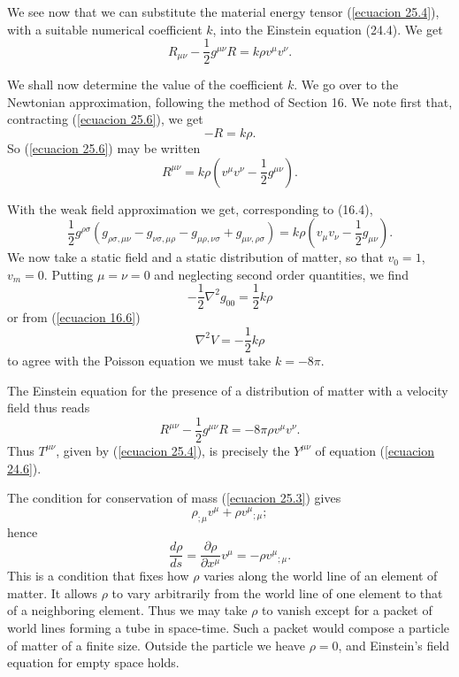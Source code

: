 We see now that we can substitute the material energy tensor (\ref{ecuacion 25.4}), with a suitable numerical 
coefficient $k$, into the Einstein equation (24.4). We get
\begin{equation}
 \label{ecuacion 25.6}
 R_{\mu\nu} - \frac{1}{2} g^{\mu\nu} R = k \rho v^\mu v^\nu.
\end{equation}

We shall now determine the value of the coefficient $k$. We go over to the Newtonian approximation, following the 
method of Section 16. We note first that, contracting (\ref{ecuacion 25.6}), we get
\[
 - R = k \rho .
\]
So (\ref{ecuacion 25.6}) may be written 
\[
 R^{\mu\nu} = k \rho \left( v^\mu v^\nu - \frac{1}{2} g^{\mu\nu} \right).
\]
 
With the weak field approximation we get, corresponding to (16.4),
\[
 \frac{1}{2} g^{\rho\sigma} \left(
     g_{\rho\sigma,\mu\nu} - g_{\nu\sigma,\mu\rho} - g_{\mu\rho,\nu\sigma} + g_{\mu\nu,\rho\sigma}
 \right)
 = k \rho \left(
     v_\mu v_\nu - \frac{1}{2}g_{\mu\nu}
 \right).
\]
We now take a static field and a static distribution of matter, so that $v_0 = 1$, $v_m = 0$. Putting $\mu = \nu = 0$ 
and neglecting second order quantities, we find 
\[
 -\frac{1}{2} \nabla^2 g_{00} = \frac{1}{2} k \rho
\]
or from (\ref{ecuacion 16.6})
\[
 \nabla^2 V = -\frac{1}{2} k \rho
\]
to agree with the Poisson equation we must take $k = - 8 \pi$.

The Einstein equation for the presence of a distribution of matter with a velocity field thus reads
\begin{equation}
 \label{ecuacion 25.7}
 R^{\mu\nu} - \frac{1}{2} g^{\mu\nu} R = - 8\pi \rho v^\mu v^\nu.
\end{equation}
Thus $T^{\mu\nu}$, given by (\ref{ecuacion 25.4}), is precisely the $Y^{\mu\nu}$ of equation (\ref{ecuacion 24.6}).

The condition for conservation of mass (\ref{ecuacion 25.3}) gives
\[
 \rho_{;\mu} v^{\mu} + \rho {v^\mu}_{;\mu};
\]
hence
\begin{equation}
 \label{ecuacion 25.8}
 \frac{d\rho}{ds} = \frac{\partial \rho}{\partial x^\mu}v^\mu = - \rho {v^\mu}_{;\mu}.
\end{equation}
This is a condition that fixes how $\rho$ varies along the world line of an element of matter. It allows $\rho$ to vary 
arbitrarily from the world line of one element to that of a neighboring element. Thus we may take $\rho$ to vanish 
except for a packet of world lines forming a tube in space-time. Such a packet would compose a particle of matter of a 
finite size. Outside the particle  we heave $\rho = 0$, and Einstein's field equation for empty space holds.

